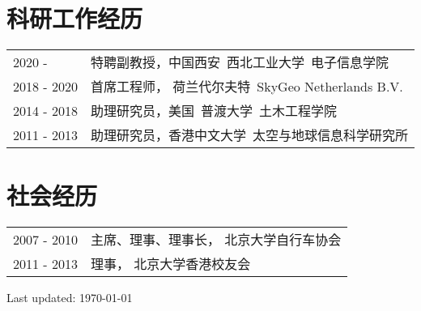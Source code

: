 \documentclass[letterpaper]{article}
\def\footerlink{}
\begin{document}

\section*{\textsc{科研工作经历}}
\begin{tabular}{ll}
2020 -      & 特聘副教授，中国西安\ 西北工业大学\ 电子信息学院  \vspace{.5em}\\
2018 - 2020 & 首席工程师， 荷兰代尔夫特\ SkyGeo Netherlands B.V. \vspace{.5em}\\
2014 - 2018 & 助理研究员，美国\ 普渡大学\ 土木工程学院 \vspace{.5em}\\
2011 - 2013 & 助理研究员，香港中文大学\ 太空与地球信息科学研究所
\end{tabular}

\section*{\textsc{社会经历}}
\begin{tabular}{ll}
2007 - 2010     & 主席、理事、理事长， 北京大学自行车协会\vspace{.5em}\\
2011 - 2013     & 理事， 北京大学香港校友会\\
\end{tabular}


\makeatletter \renewcommand\@biblabel[1]{[#1]} \makeatother



\begin{center}
  \begin{footnotesize}
    Last updated: \today \\
  \end{footnotesize}
\end{center}
\end{document}
